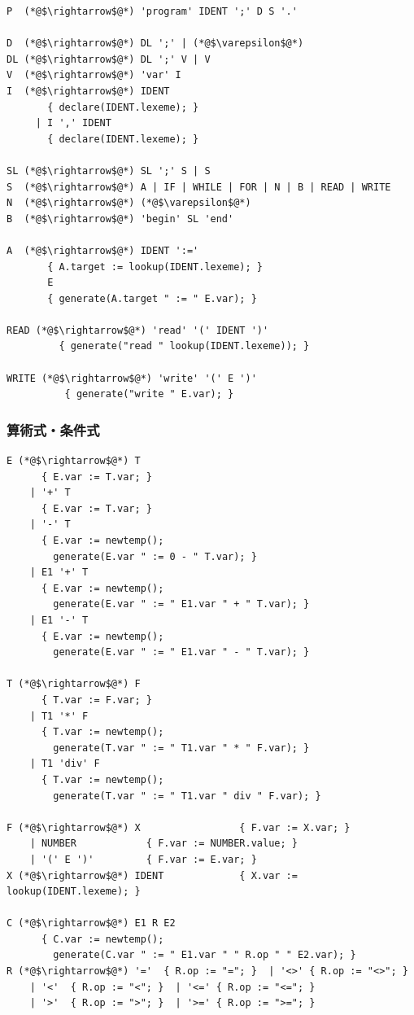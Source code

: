 \documentclass[dvipdfmx,a4j]{jbook}
\begin{document}
\begin{lstlisting}
P  (*@$\rightarrow$@*) 'program' IDENT ';' D S '.'

D  (*@$\rightarrow$@*) DL ';' | (*@$\varepsilon$@*)
DL (*@$\rightarrow$@*) DL ';' V | V
V  (*@$\rightarrow$@*) 'var' I
I  (*@$\rightarrow$@*) IDENT
       { declare(IDENT.lexeme); }
     | I ',' IDENT
       { declare(IDENT.lexeme); }

SL (*@$\rightarrow$@*) SL ';' S | S
S  (*@$\rightarrow$@*) A | IF | WHILE | FOR | N | B | READ | WRITE
N  (*@$\rightarrow$@*) (*@$\varepsilon$@*)
B  (*@$\rightarrow$@*) 'begin' SL 'end'

A  (*@$\rightarrow$@*) IDENT ':='
       { A.target := lookup(IDENT.lexeme); }
       E
       { generate(A.target " := " E.var); }

READ (*@$\rightarrow$@*) 'read' '(' IDENT ')'
         { generate("read " lookup(IDENT.lexeme)); }

WRITE (*@$\rightarrow$@*) 'write' '(' E ')'
          { generate("write " E.var); }
\end{lstlisting}

\subsubsection{算術式・条件式}

\begin{lstlisting}
E (*@$\rightarrow$@*) T
      { E.var := T.var; }
    | '+' T
      { E.var := T.var; }
    | '-' T
      { E.var := newtemp();
        generate(E.var " := 0 - " T.var); }
    | E1 '+' T
      { E.var := newtemp();
        generate(E.var " := " E1.var " + " T.var); }
    | E1 '-' T
      { E.var := newtemp();
        generate(E.var " := " E1.var " - " T.var); }

T (*@$\rightarrow$@*) F
      { T.var := F.var; }
    | T1 '*' F
      { T.var := newtemp();
        generate(T.var " := " T1.var " * " F.var); }
    | T1 'div' F
      { T.var := newtemp();
        generate(T.var " := " T1.var " div " F.var); }

F (*@$\rightarrow$@*) X                 { F.var := X.var; }
    | NUMBER            { F.var := NUMBER.value; }
    | '(' E ')'         { F.var := E.var; }
X (*@$\rightarrow$@*) IDENT             { X.var := lookup(IDENT.lexeme); }

C (*@$\rightarrow$@*) E1 R E2
      { C.var := newtemp();
        generate(C.var " := " E1.var " " R.op " " E2.var); }
R (*@$\rightarrow$@*) '='  { R.op := "="; }  | '<>' { R.op := "<>"; }
    | '<'  { R.op := "<"; }  | '<=' { R.op := "<="; }
    | '>'  { R.op := ">"; }  | '>=' { R.op := ">="; }
\end{lstlisting}
\end{document}
